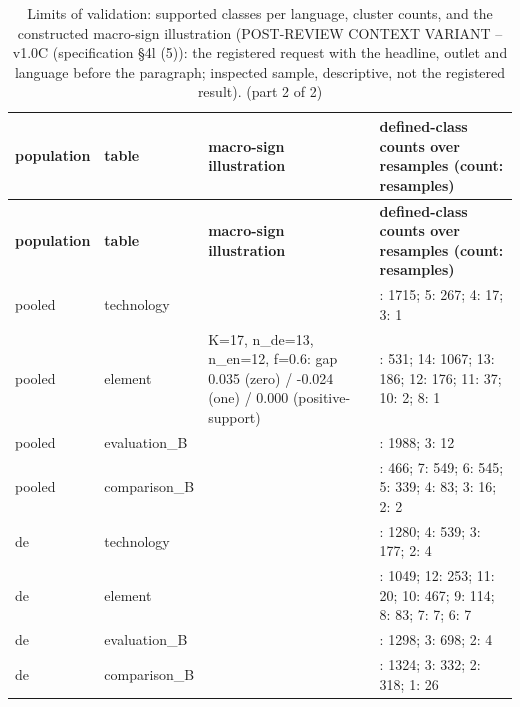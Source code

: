 \begingroup\footnotesize
\begin{longtable}{>{\raggedright\arraybackslash}p{67.3pt}>{\raggedright\arraybackslash}p{61.3pt}>{\raggedright\arraybackslash}p{154.2pt}>{\raggedright\arraybackslash}p{124.2pt}}
\caption{Limits of validation:\allowbreak{} supported classes per language, cluster counts, and the constructed macro-sign illustration (POST-REVIEW CONTEXT VARIANT -- v1.0C (specification §4l (5)):\allowbreak{} the registered request with the headline, outlet and language before the paragraph; inspected sample, descriptive, not the registered result). (part 2 of 2)} \\
\toprule
\textbf{population} & \textbf{table} & \textbf{macro-sign illustration} & \textbf{defined-class counts over resamples (count:\allowbreak{} resamples)} \\
\midrule
\endfirsthead
\toprule
\textbf{population} & \textbf{table} & \textbf{macro-sign illustration} & \textbf{defined-class counts over resamples (count:\allowbreak{} resamples)} \\
\midrule
\endhead
\bottomrule
\endfoot
pooled & technology &  & 6:\allowbreak{} 1715; 5:\allowbreak{} 267; 4:\allowbreak{} 17; 3:\allowbreak{} 1 \\
pooled & element & K=\allowbreak{}17, n\_\allowbreak{}de=\allowbreak{}13, n\_\allowbreak{}en=\allowbreak{}12, f=\allowbreak{}0.6:\allowbreak{} gap 0.035 (zero) / -0.024 (one) / 0.000 (positive-support) & 15:\allowbreak{} 531; 14:\allowbreak{} 1067; 13:\allowbreak{} 186; 12:\allowbreak{} 176; 11:\allowbreak{} 37; 10:\allowbreak{} 2; 8:\allowbreak{} 1 \\
pooled & evaluation\_\allowbreak{}B &  & 4:\allowbreak{} 1988; 3:\allowbreak{} 12 \\
pooled & comparison\_\allowbreak{}B &  & 8:\allowbreak{} 466; 7:\allowbreak{} 549; 6:\allowbreak{} 545; 5:\allowbreak{} 339; 4:\allowbreak{} 83; 3:\allowbreak{} 16; 2:\allowbreak{} 2 \\
de & technology &  & 5:\allowbreak{} 1280; 4:\allowbreak{} 539; 3:\allowbreak{} 177; 2:\allowbreak{} 4 \\
de & element &  & 13:\allowbreak{} 1049; 12:\allowbreak{} 253; 11:\allowbreak{} 20; 10:\allowbreak{} 467; 9:\allowbreak{} 114; 8:\allowbreak{} 83; 7:\allowbreak{} 7; 6:\allowbreak{} 7 \\
de & evaluation\_\allowbreak{}B &  & 4:\allowbreak{} 1298; 3:\allowbreak{} 698; 2:\allowbreak{} 4 \\
de & comparison\_\allowbreak{}B &  & 4:\allowbreak{} 1324; 3:\allowbreak{} 332; 2:\allowbreak{} 318; 1:\allowbreak{} 26 \\

\end{longtable}
